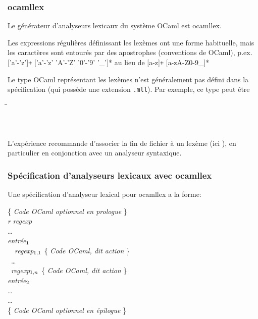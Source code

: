 %
\begin{frame}
\frametitle{ocamllex}

Le générateur d'analyseurs lexicaux du système OCaml est
\textsf{ocamllex}.

Les expressions régulières définissant les lexèmes ont une forme
habituelle, mais les caractères sont entourés par des apostrophes
(conventions de OCaml), p.ex. \textsf{['a'-'z']\texttt{+} ['a'-'z'
'A'-'Z' '0'-'9' '\_']*} au lieu de \textsf{[a-z]\texttt{+}
[a-zA-Z0-9\_]*}

Le type OCaml représentant les lexèmes n'est généralement pas défini
dans la spécification (qui possède une extension \texttt{.mll}). Par
exemple, ce type peut être
{\small
 \begin{tabbing}
 \Xtype {} \= \equal \= \Tint \Xof {} \vbar{}
 \Tident \Xof {} \vbar{} \Ttrue \vbar{} \Tfalse\\
 \> \vbar \> \Tplus \vbar{} \Tminus \vbar{} \Ttimes \vbar{} \Tslash
 \vbar{} \Tequal \vbar{} \Tarrow\\
 \> \vbar \> \Tlpar \vbar{} \Trpar \Tlet \vbar{} \Tin \vbar{} \Trec\\
 \> \vbar \> \Tfun \vbar{}
 \Tif \vbar{} \Tthen \vbar{} \Telse \vbar{} \Tand \vbar{} \Tor \vbar{}
 \Tnot \vbar{} \textcolor{blue}{\Teof}
 \end{tabbing}
}

L'expérience recommande d'associer la fin de fichier à un lexème (ici
\Teof), en particulier en conjonction avec un analyseur syntaxique.

\end{frame}

%
\begin{frame}
\frametitle{Spécification d'analyseurs lexicaux avec ocamllex}

Une spécification d'analyseur lexical pour \textsf{ocamllex} a la
forme:
{\small
\begin{tabbing}
\{ \emph{Code OCaml optionnel en prologue} \}\\
\Xlet \emph{r} \equal \emph{regexp}\\
\ldots\\
\Xrule \= \emph{entrée}\(\sb{1}\) \equal \Xparse\\
\> \ \ \emph{regexp}\(\sb{1,1}\) \{ \emph{Code OCaml, dit
  \emph{action}} \}\\
\> \vbar{} \ \ldots\\
\> \vbar{} \ \emph{regexp}\(\sb{1,n}\) \{ \emph{Code OCaml, dit
  \emph{action}} \}\\
\Xand \= \emph{entrée}\(\sb{2}\) \equal \Xparse\\
\> \ldots\\
\Xand \ldots\\
\{ \emph{Code OCaml optionnel en épilogue} \}
\end{tabbing}
}

\end{frame}

